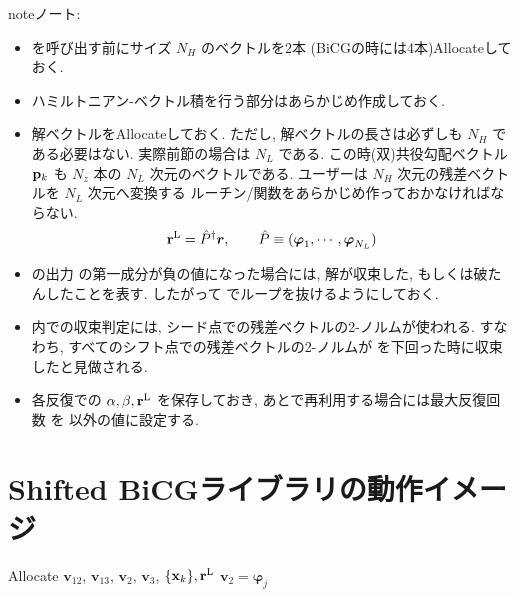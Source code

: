 \documentclass[letterpaper,10pt,dvipdfmx,openany]{sphinxmanual}
\begin{document}
\begin{notice}{note}{ノート:}\begin{itemize}
\item {} 
 を呼び出す前にサイズ \(N_H\) のベクトルを2本
(BiCGの時には4本)Allocateしておく.

\item {} 
ハミルトニアン-ベクトル積を行う部分はあらかじめ作成しておく.

\item {} 
解ベクトルをAllocateしておく. ただし,
解ベクトルの長さは必ずしも \(N_H\) である必要はない.
実際前節の場合は \(N_L\) である.
この時(双)共役勾配ベクトル \({\bf p}_k\) も
\(N_z\) 本の \(N_L\) 次元のベクトルである.
ユーザーは \(N_H\) 次元の残差ベクトルを \(N_L\) 次元へ変換する
ルーチン/関数をあらかじめ作っておかなければならない.
\begin{gather}
\begin{split}\begin{aligned}
{\bf r}^{\rm L} = {\hat P}^\dagger {\boldsymbol r}, \qquad
{\hat P} \equiv ({\boldsymbol \varphi}_1, \cdots, {\boldsymbol \varphi}_{N_L})
\end{aligned}\end{split}\notag
\end{gather}
\item {} 
 の出力  の第一成分が負の値になった場合には,
解が収束した, もしくは破たんしたことを表す.
したがって  でループを抜けるようにしておく.

\item {} 
 内での収束判定には,
シード点での残差ベクトルの2-ノルムが使われる.
すなわち, すべてのシフト点での残差ベクトルの2-ノルムが
 を下回った時に収束したと見做される.

\item {} 
各反復での \(\alpha, \beta, {\bf r}^{\rm L}\) を保存しておき,
あとで再利用する場合には最大反復回数  を  以外の値に設定する.

\end{itemize}
\end{notice}


\section{Shifted BiCGライブラリの動作イメージ}
\label{komega_workflow_ja:shifted-bicg}
Allocate \({\boldsymbol v}_{1 2}\), \({\boldsymbol v}_{1 3}\),
\({\boldsymbol v}_2\), \({\boldsymbol v}_3\),
\(\{{\bf x}_k\}, {\bf r}^{\rm L}\)
\({\boldsymbol v}_2 = {\boldsymbol \varphi_j}\)
\end{document}
